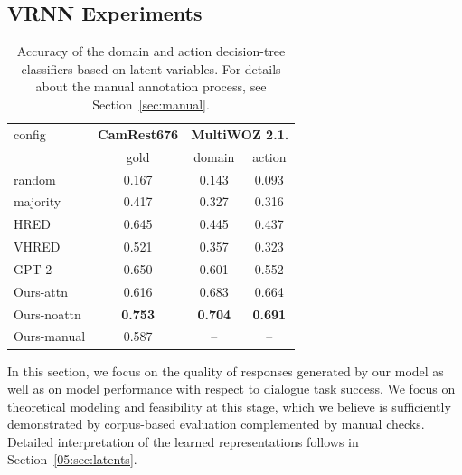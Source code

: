 \subsection{VRNN Experiments}

\begin{table}[tp]
    \centering\small
    \begin{tabular}{l|c|cc}
      \toprule
      config & \textbf{CamRest676} & \multicolumn{2}{c}{\textbf{MultiWOZ 2.1.}} \\
       & gold & domain & action \\
      \midrule
      random  & 0.167 & 0.143 & 0.093 \\
      majority &  0.417 & 0.327 & 0.316 \\\hdashline[0.5pt/2pt]
      HRED & 0.645 & 0.445 & 0.437 \\
      VHRED & 0.521 & 0.357 & 0.323 \\
      GPT-2 & 0.650 & 0.601 & 0.552 \\
      Ours-attn & 0.616 & 0.683 & 0.664 \\
      Ours-noattn & \textbf{0.753} &  \textbf{0.704} & \textbf{0.691} \\\hdashline[0.5pt/2pt]
      Ours-manual & 0.587 & -- & -- \\

      \bottomrule
  \end{tabular}
  \caption{Accuracy of the domain and action decision-tree classifiers based on latent variables. 
  For details about the manual annotation process, see Section~\ref{sec:manual}.}
  \label{tab:latent_classification}
\end{table}


In this section, we focus on the quality of responses generated by our model as well as on model performance with respect to dialogue task success.
We focus on theoretical modeling and feasibility at this stage, which we believe is sufficiently demonstrated by corpus-based evaluation complemented by manual checks. Detailed interpretation of the learned representations follows in Section~\ref{05:sec:latents}.

